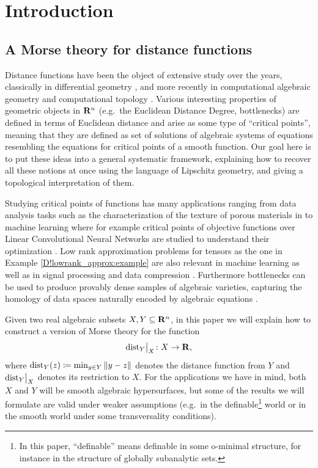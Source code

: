 \section{Introduction}

\subsection{A Morse theory for distance functions}

Distance functions have been the object of extensive study over the years, classically in differential geometry \cite{Looijenga1974,Wall1977,Grove_annals,Yomdin1981,cheeger,BrockerKupper2000,Rifford2004,CohenSteinerCommaret2024}, and more recently in computational algebraic geometry  \cite{Ottaviani2018TheDF,DREW2020,DEEGH2023,BKS2024} and computational topology \cite{Chazal_Lieutier,bobrowski2014distance,Oudot2015,SYM2025,ACSD2023}.
Various interesting properties of geometric objects in $\mathbf{R}^n$ (e.g.\ the Euclidean Distance Degree, bottlenecks) are defined in terms of Euclidean distance and arise as some type of ``critical points'', meaning that they are defined as set of solutions of algebraic systems of equations resembling the equations for critical points of a smooth function.
Our goal here is to put these ideas  into a general systematic framework, explaining how to recover all these notions at once using the language of Lipschitz geometry, and giving  a topological interpretation of them. 

Studying critical points of functions has many applications ranging from data analysis tasks such as the characterization of the texture of porous materials in \cite{SYM2025} to machine learning where for example critical points of objective functions over Linear Convolutional Neural Networks are studied to understand their optimization \cite{Kohn_22, Kohn_24}. Low rank approximation problems for tensors as the one in Example \ref{D!lowrank_approx:example} are also relevant in machine learning as well as in signal processing and data compression \cite{Bader_tensors,MAL-059}. Furthermore bottlenecks can be used to produce provably dense samples of algebraic varieties, capturing the homology of data spaces naturally encoded by algebraic equations \cite{Sampling_bottlenecks}.

Given two real algebraic subsets $X, Y \subseteq \mathbf{R}^n$, in this paper we will explain how to construct a version of Morse theory for the function
\[
  \mathord{\operatorname{dist}}_Y\big|_X \colon X \to \mathbf{R},
\]
where $\operatorname{dist}_Y(z) \coloneq \min_{y\in Y} \| y - z \|$ denotes the distance function from $Y$ and $\mathord{\operatorname{dist}}_Y\big|_X$ denotes its restriction to $X$. For the applications we have in mind, both $X$ and $Y$ will be smooth algebraic hypersurfaces, but some of the results we will formulate are valid under weaker assumptions (e.g.\ in the definable\footnote{In this paper, ``definable'' means definable in some o-minimal structure, for instance in the structure of globally subanalytic sets.} world or in the smooth world under some transversality conditions).

